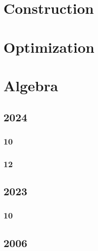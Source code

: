 \documentclass[11pt]{book}
\begin{document}
\chapter{Construction}

%


\chapter{Optimization}

%


\chapter{Algebra}
\section{2024}
\subsection{10}

\subsection{12}

\section{2023}
\subsection{10}

\section{2006}                      
\end{document}
